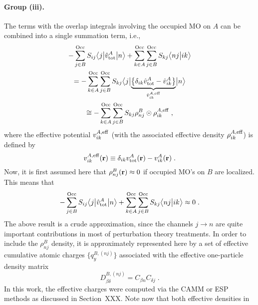 \paragraph{Group (iii).}
The terms with the overlap integrals involving the occupied MO on $A$
can be combined into a single summation term, i.e.,
\begin{multline}
       - \sum_{j\in B}^{\rm Occ} S_{ij} \tBraKet{j}{\hat{v}^A_{\rm tot} }{n}  
     + \sum_{k\in A}^{\rm Occ} \sum_{j\in B}^{\rm Occ}  
        S_{kj} 
        \BraKet{nj}{ik} \\ = -
 \sum_{k\in A}^{\rm Occ} 
 \sum_{j\in B}^{\rm Occ}
 S_{kj} 
 \tBraKet{j}{
 \underbrace{
 \left\{ 
  \delta_{ik} \hat{v}^A_{\rm tot} - \hat{v}^A_{ik}
 \right\} 
  }_{\hat{v}^{A,{\rm eff}}_{ik}}
 }{n}  \\ \cong -
%
  \sum_{k\in A}^{\rm Occ} 
 \sum_{j\in B}^{\rm Occ}
 S_{kj} 
 \rho_{nj}^B \odot \rho^{A,{\rm eff}}_{ik} \;,
\end{multline}
%
where the effective potential ${v}^{A,{\rm eff}}_{ik}$ (with the associated 
effective density $\rho^{A,{\rm eff}}_{ik}$) 
is defined by
%
\begin{equation} \label{e:ct.group-iii.oep}
 {v}^{A,{\rm eff}}_{ik}({\bf r}) \equiv
 \delta_{ik} 
 {v}^A_{\rm tot} ({\bf r})- {v}^A_{ik} ({\bf r}) \;.
\end{equation}
%
Now, it is first assumed here that $\rho^{B}_{nj} ({\bf r}) \approx 0$ if occupied MO's on $B$ are localized.
This means that
%
\begin{equation} \label{e:ct.group-iii.final.a}
        - \sum_{j\in B}^{\rm Occ} S_{ij} \bigl\langle {j} \bigl\lvert {\hat{v}^A_{\rm tot} } \bigl\lvert {n} \bigr\rangle  
     + \sum_{k\in A}^{\rm Occ} \sum_{j\in B}^{\rm Occ}  
        S_{kj} 
        \bigl\langle {nj} \bigl\lvert {ik} \bigr\rangle \approx 0 \;.
\end{equation}
%
The above result is a crude approximation, since the channels $j\rightarrow n$
are quite important contributions in most of perturbation theory treatments.
In order to include the $\rho^{B}_{nj}$ density, it is approximately represented here by a set of effective 
cumulative
atomic charges $\{ q^{B,(nj)}_{y} \}$ associated with the effective one\hyp{}particle density matrix
%
\begin{equation}
 D^{B,(nj)}_{\beta\delta} = C_{\beta n} C_{\delta j} \;.
\end{equation}
%
In this work, the effective charges were computed via the CAMM or ESP methods as
discussed in Section~XXX. 
Note now that both effective densities in 
